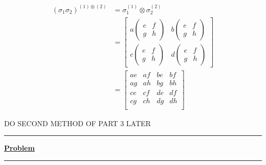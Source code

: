 \documentclass[twoside]{article}
\begin{document}
\begin{enumerate}
   \begin{align*}
      (\sigma_1 \sigma_2)^{(1)\otimes(2)} &= \sigma_1^{(1)} \otimes \sigma_2^{(2)} \\
      &= \begin{bmatrix}
         a \begin{pmatrix}
            e & f \\
            g & h
         \end{pmatrix} &          b \begin{pmatrix}
            e & f \\
            g & h
         \end{pmatrix} \\
         c \begin{pmatrix}
            e & f \\
            g & h
         \end{pmatrix} &          d \begin{pmatrix}
            e & f \\
            g & h
         \end{pmatrix} 
      \end{bmatrix} \\
   &= \begin{bmatrix}
      ae & af & be & bf \\
      ag & ah & bg & bh \\
      ce & cf & de & df \\
      cg & ch & dg & dh \\
   \end{bmatrix}
   \end{align*}

   DO SECOND METHOD OF PART 3 LATER
\end{enumerate}

\vskip 0.5cm
\hrule
\vskip 0.5cm




\underline{\textbf{Problem}}

\vskip 0.5cm
\hrule
\vskip 0.5cm
\end{document}

